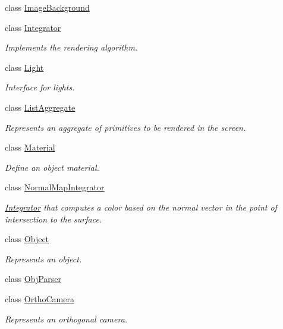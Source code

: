 \begin{DoxyCompactItemize}
class \mbox{\hyperlink{classomg_1_1_image_background}{Image\+Background}}
\item 
class \mbox{\hyperlink{classomg_1_1_integrator}{Integrator}}
\begin{DoxyCompactList}\small\item\em Implements the rendering algorithm. \end{DoxyCompactList}\item 
class \mbox{\hyperlink{classomg_1_1_light}{Light}}
\begin{DoxyCompactList}\small\item\em Interface for lights. \end{DoxyCompactList}\item 
class \mbox{\hyperlink{classomg_1_1_list_aggregate}{List\+Aggregate}}
\begin{DoxyCompactList}\small\item\em Represents an aggregate of primitives to be rendered in the screen. \end{DoxyCompactList}\item 
class \mbox{\hyperlink{classomg_1_1_material}{Material}}
\begin{DoxyCompactList}\small\item\em Define an object material. \end{DoxyCompactList}\item 
class \mbox{\hyperlink{classomg_1_1_normal_map_integrator}{Normal\+Map\+Integrator}}
\begin{DoxyCompactList}\small\item\em \mbox{\hyperlink{classomg_1_1_integrator}{Integrator}} that computes a color based on the normal vector in the point of intersection to the surface. \end{DoxyCompactList}\item 
class \mbox{\hyperlink{classomg_1_1_object}{Object}}
\begin{DoxyCompactList}\small\item\em Represents an object. \end{DoxyCompactList}\item 
class \mbox{\hyperlink{classomg_1_1_obj_parser}{Obj\+Parser}}
\item 
class \mbox{\hyperlink{classomg_1_1_ortho_camera}{Ortho\+Camera}}
\begin{DoxyCompactList}\small\item\em Represents an orthogonal camera. \end{DoxyCompactList}\item 

\end{DoxyCompactItemize}
